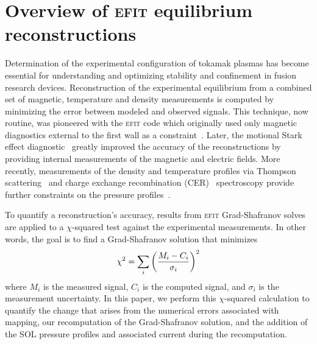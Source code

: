 \documentclass[english,aps,superscriptaddress,showkeys,showpacs,prepri,twocolumn]{revtex4}
\begin{document}
\section{Overview of \textsc{efit} equilibrium reconstructions}
\label{sec:efitreview}

Determination of the experimental configuration of tokamak plasmas
has become essential for understanding and optimizing stability and confinement
in fusion research devices.  Reconstruction of the experimental equilibrium
from a combined set of magnetic, temperature and density measurements is
computed by minimizing the error between modeled and observed signals.  This
technique, now routine, was pioneered with the \textsc{efit} code which
originally used only magnetic diagnostics external to the first wall as a
constraint~\cite{Lao:1985ww,Lao:1985wa}.  Later, the motional Stark effect
diagnostic~\cite{wroblewski1990motional,rice99} greatly improved the accuracy of the
reconstructions by providing internal measurements of the magnetic and electric
fields.  More recently, measurements of the density and temperature profiles
via Thompson scattering~\cite{carlstrom92,eldon12} and charge exchange recombination
(CER)~\cite{groebner90,chrystal15} spectroscopy provide further
constraints on the pressure profiles~\cite{Lao90}.

To quantify a reconstruction's accuracy, results from \textsc{efit} Grad-Shafranov
solves are applied to a $\chi$-squared test against the experimental measurements.
In other words, the goal is to find a Grad-Shafranov solution that minimizes
\begin{equation}
   \chi^2 = \sum_i{\left( \frac{M_i - C_i}{\sigma_i} \right)^2}
   \label{chi-squared}
\end{equation}
where $M_i$ is the measured signal, $C_i$ is the computed signal, and
$\sigma_i$ is the measurement uncertainty.  In this paper, we perform this
$\chi$-squared calculation to quantify the change that arises from the
numerical errors associated with mapping, our recomputation of the Grad-Shafranov
solution, and the addition of the SOL pressure profiles and associated current
during the recomputation.
\end{document}
